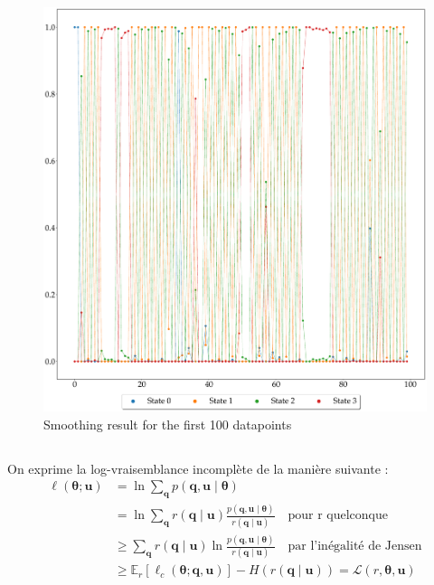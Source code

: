 \documentclass[12pt,a4paper,onecolumn]{article}
\begin{document}
\begin{figure}[H]
	\centering
	\includegraphics[width = 1.0\textwidth]{2_smoothing.eps}
	\caption{Smoothing result for the first 100 datapoints}
	\label{fig_2_smoothing}
\end{figure}


\subsection{}

On exprime la log-vraisemblance incomplète de la manière suivante :
\begin{equation}
	\begin{split}
		\ell(\bm{\theta} ; \bm{u}) &= \ln \sum_{\bm{q}}p\left(\bm{q}, \bm{u} \mid \bm{\theta}\right)\\
		&= \ln \sum_{\bm{q}}r(\bm{q} \mid \bm{u}) \frac{p\left(\bm{q}, \bm{u} \mid \bm{\theta}\right)}{r(\bm{q} \mid \bm{u})} \quad \text{pour r quelconque}\\
		&\ge \sum_{\bm{q}}r(\bm{q} \mid \bm{u}) \ln \frac{p\left(\bm{q}, \bm{u} \mid \bm{\theta}\right)}{r(\bm{q} \mid \bm{u})} \quad \text{par l'inégalité de Jensen}\\
		&\ge \mathbb{E}_{r}[\ell_c(\bm{\theta} ; \bm{q}, \bm{u})]- H(r(\bm{q} \mid \bm{u})) = \mathcal{L}(r, \bm{\theta}, \bm{u})\\
	\end{split}
\end{equation}
\end{document}
